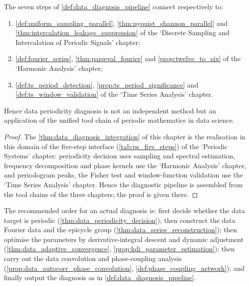 \begin{theorem}\label{thm:data_diagnosis_integration}
The seven steps of \cref{def:data_diagnosis_pipeline} connect respectively to:
\begin{enumerate}[label=(\roman*)]
    \item \cref{def:uniform_sampling_parallel}, \cref{thm:nyquist_shannon_parallel} and \cref{thm:intercalation_leakage_suppression} of the `Discrete Sampling and Intercalation of Periodic Signals' chapter;
    \item \cref{def:fourier_series}, \cref{thm:parseval_fourier} and \cref{prop:twelve_to_six} of the `Harmonic Analysis' chapter;
    \item \cref{def:ts_period_detection}, \cref{prop:ts_period_significance} and \cref{def:ts_window_validation} of the `Time Series Analysis' chapter.
\end{enumerate}
Hence data periodicity diagnosis is not an independent method but an application of the unified tool chain of periodic mathematics in data science.
\end{theorem}

\begin{proof}
The \cref{thm:data_diagnosis_integration} of this chapter is the realisation in this domain of the five-step interface (\cref{tab:ps_five_steps}) of the `Periodic Systems' chapter:
periodicity decision uses sampling and spectral estimation, frequency decomposition and phase kernels use the `Harmonic Analysis' chapter, and periodogram peaks, the Fisher test and
window-function validation use the `Time Series Analysis' chapter. Hence the diagnostic pipeline is assembled from the tool chains of the three chapters; the proof is given there.
\end{proof}

\begin{remark}\label{rem:data_integration_order}
The recommended order for an actual diagnosis is: first decide whether the data target is periodic (\cref{thm:data_periodicity_decision}); then construct the data Fourier data and the epicycle group (\cref{thm:data_series_reconstruction}); then optimise the parameters by derivative-integral descent and dynamic adjustment (\cref{thm:data_adaptive_convergence}, \cref{prop:kdi_parameter_estimation}); then carry out the data convolution and phase-coupling analysis (\cref{prop:data_autocorr_phase_convolution}, \cref{def:phase_coupling_network}); and finally output the diagnosis as in \cref{def:data_diagnosis_pipeline}.
\end{remark}


